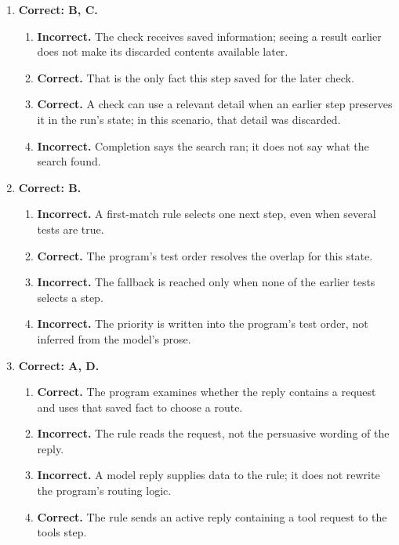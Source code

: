 \begin{enumerate}[start=21,itemsep=0.7\baselineskip]
\item[{\hyperref[exercise:21]{21.}}] \begin{minipage}[t]{\linewidth}
\textbf{Correct: B, C.}
\begin{enumerate}[label=\textnormal{(\Alph*)},leftmargin=*,itemsep=0pt]
\item \textbf{Incorrect.} The check receives saved information; seeing a result earlier does not make its discarded contents available later.
\item \textbf{Correct.} That is the only fact this step saved for the later check.
\item \textbf{Correct.} A check can use a relevant detail when an earlier step preserves it in the run's state; in this scenario, that detail was discarded.
\item \textbf{Incorrect.} Completion says the search ran; it does not say what the search found.
\end{enumerate}
\end{minipage}

\item[{\hyperref[exercise:22]{22.}}] \begin{minipage}[t]{\linewidth}
\textbf{Correct: B.}
\begin{enumerate}[label=\textnormal{(\Alph*)},leftmargin=*,itemsep=0pt]
\item \textbf{Incorrect.} A first-match rule selects one next step, even when several tests are true.
\item \textbf{Correct.} The program's test order resolves the overlap for this state.
\item \textbf{Incorrect.} The fallback is reached only when none of the earlier tests selects a step.
\item \textbf{Incorrect.} The priority is written into the program's test order, not inferred from the model's prose.
\end{enumerate}
\end{minipage}

\item[{\hyperref[exercise:23]{23.}}] \begin{minipage}[t]{\linewidth}
\textbf{Correct: A, D.}
\begin{enumerate}[label=\textnormal{(\Alph*)},leftmargin=*,itemsep=0pt]
\item \textbf{Correct.} The program examines whether the reply contains a request and uses that saved fact to choose a route.
\item \textbf{Incorrect.} The rule reads the request, not the persuasive wording of the reply.
\item \textbf{Incorrect.} A model reply supplies data to the rule; it does not rewrite the program's routing logic.
\item \textbf{Correct.} The rule sends an active reply containing a tool request to the tools step.
\end{enumerate}
\end{minipage}


\end{enumerate}
